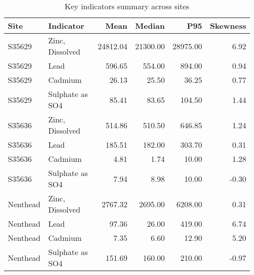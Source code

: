 \begin{table}[ht]
\centering
\caption{Key indicators summary across sites}

\begin{tabular}{llrrrr}
\toprule
Site & Indicator & Mean & Median & P95 & Skewness \\
\midrule
S35629 & Zinc, Dissolved & 24812.04 & 21300.00 & 28975.00 & 6.92 \\
S35629 & Lead & 596.65 & 554.00 & 894.00 & 0.94 \\
S35629 & Cadmium & 26.13 & 25.50 & 36.25 & 0.77 \\
S35629 & Sulphate as SO4 & 85.41 & 83.65 & 104.50 & 1.44 \\
S35636 & Zinc, Dissolved & 514.86 & 510.50 & 646.85 & 1.24 \\
S35636 & Lead & 185.51 & 182.00 & 303.70 & 0.31 \\
S35636 & Cadmium & 4.81 & 1.74 & 10.00 & 1.28 \\
S35636 & Sulphate as SO4 & 7.94 & 8.98 & 10.00 & -0.30 \\
Nenthead & Zinc, Dissolved & 2767.32 & 2695.00 & 6208.00 & 0.31 \\
Nenthead & Lead & 97.36 & 26.00 & 419.00 & 6.74 \\
Nenthead & Cadmium & 7.35 & 6.60 & 12.90 & 5.20 \\
Nenthead & Sulphate as SO4 & 151.69 & 160.00 & 210.00 & -0.97 \\
\bottomrule
\end{tabular}
\end{table}